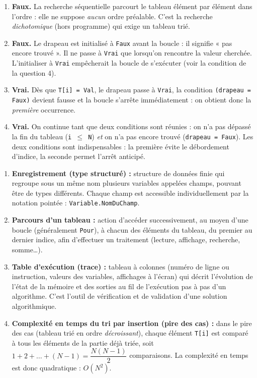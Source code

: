 \documentclass[11pt]{article}
\newcommand{\cle}[1]{{\popxbold\color{popdark}#1}}
\begin{document}
\begin{corrige}
\begin{enumerate}
    \item \textbf{Faux.} La recherche \cle{séquentielle} parcourt le tableau élément par élément dans l'ordre : elle ne suppose \emph{aucun} ordre préalable. C'est la recherche \emph{dichotomique} (hors programme) qui exige un tableau trié.
    \item \textbf{Faux.} Le drapeau est initialisé à \texttt{Faux} avant la boucle : il signifie « pas encore trouvé ». Il ne passe à \texttt{Vrai} que lorsqu'on rencontre la valeur cherchée. L'initialiser à \texttt{Vrai} empêcherait la boucle de s'exécuter (voir la condition de la question 4).
    \item \textbf{Vrai.} Dès que \texttt{T[i] = Val}, le drapeau passe à \texttt{Vrai}, la condition \texttt{(drapeau = Faux)} devient fausse et la boucle s'arrête immédiatement : on obtient donc la \emph{première} occurrence.
    \item \textbf{Vrai.} On continue tant que deux conditions sont réunies : on n'a pas dépassé la fin du tableau (\texttt{i $\le$ N}) \emph{et} on n'a pas encore trouvé (\texttt{drapeau = Faux}). Les deux conditions sont indispensables : la première évite le débordement d'indice, la seconde permet l'arrêt anticipé.
\end{enumerate}
\end{corrige}

\begin{corrige}
\begin{enumerate}
    \item \textbf{Enregistrement (type structuré) :} structure de données finie qui regroupe sous un même nom plusieurs variables appelées \cle{champs}, pouvant être de types différents. Chaque champ est accessible individuellement par la notation pointée : \texttt{Variable.NomDuChamp}.
    \item \textbf{Parcours d'un tableau :} action d'accéder successivement, au moyen d'une boucle (généralement \texttt{Pour}), à chacun des éléments du tableau, du premier au dernier indice, afin d'effectuer un traitement (lecture, affichage, recherche, somme\dots).
    \item \textbf{Table d'exécution (trace) :} tableau à colonnes (numéro de ligne ou instruction, valeurs des variables, affichages à l'écran) qui décrit l'évolution de l'état de la mémoire et des sorties au fil de l'exécution pas à pas d'un algorithme. C'est l'outil de vérification et de validation d'une solution algorithmique.
    \item \textbf{Complexité en temps du tri par insertion (pire des cas) :} dans le pire des cas (tableau trié en ordre \emph{décroissant}), chaque élément \texttt{T[i]} est comparé à tous les éléments de la partie déjà triée, soit $1 + 2 + \dots + (N-1) = \dfrac{N(N-1)}{2}$ comparaisons. La complexité en temps est donc \cle{quadratique} : $O(N^2)$.
\end{enumerate}
\end{corrige}
\end{document}
